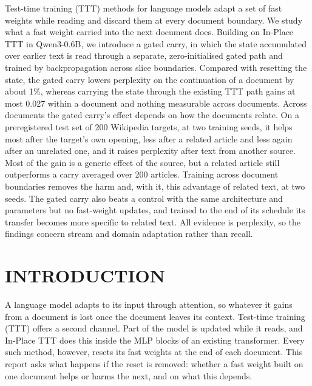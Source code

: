 \documentclass[12pt,a4paper]{report}
\begin{document}
Test-time training (TTT) methods for language models adapt a set of fast weights while reading and discard them at every document boundary. We study what a fast weight carried into the next document does. Building on In-Place TTT in Qwen3-0.6B, we introduce a gated carry, in which the state accumulated over earlier text is read through a separate, zero-initialised gated path and trained by backpropagation across slice boundaries. Compared with resetting the state, the gated carry lowers perplexity on the continuation of a document by about 1\%, whereas carrying the state through the existing TTT path gains at most 0.027 within a document and nothing measurable across documents. Across documents the gated carry's effect depends on how the documents relate. On a preregistered test set of 200 Wikipedia targets, at two training seeds, it helps most after the target's own opening, less after a related article and less again after an unrelated one, and it raises perplexity after text from another source. Most of the gain is a generic effect of the source, but a related article still outperforms a carry averaged over 200 articles. Training across document boundaries removes the harm and, with it, this advantage of related text, at two seeds. The gated carry also beats a control with the same architecture and parameters but no fast-weight updates, and trained to the end of its schedule its transfer becomes more specific to related text. All evidence is perplexity, so the findings concern stream and domain adaptation rather than recall.

\clearpage
{}
{}
\tableofcontents
\clearpage
{}
{}
\listoftables
{}
{}
\listoffigures

\clearpage
{}

\chapter{INTRODUCTION}
\label{ch-intro}

A language model adapts to its input through attention, so whatever it gains from a document is lost once the document leaves its context. Test-time training (TTT) offers a second channel. Part of the model is updated while it reads, and In-Place TTT \citep{feng2026inplace} does this inside the MLP blocks of an existing transformer. Every such method, however, resets its fast weights at the end of each document. This report asks what happens if the reset is removed: whether a fast weight built on one document helps or harms the next, and on what this depends.
\end{document}
